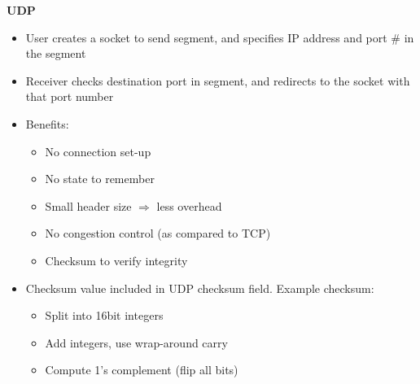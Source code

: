 \documentclass[a4paper]{article} \usepackage[backend=biber, style=numeric, sorting=none]{biblatex}
\begin{document}
\begin{multicols*}{4}
\textbf{UDP}
\begin{itemize}[leftmargin=*]
\item User creates a socket to send segment, and specifies IP address and port \# in the segment
\item Receiver checks destination port in segment, and redirects to the socket with that port number
\item Benefits:
  \begin{itemize}[leftmargin=*]
  \item No connection set-up
  \item No state to remember
  \item Small header size $\Rightarrow$ less overhead
  \item No congestion control (as compared to TCP)
  \item Checksum to verify integrity
  \end{itemize}
\item Checksum value included in UDP checksum field. Example checksum:
  \begin{itemize}[leftmargin=*]
  \item Split into 16bit integers
  \item Add integers, use wrap-around carry
  \item Compute 1's complement (flip all bits)
  \end{itemize}
\end{itemize}


\end{multicols*}
\end{document}
